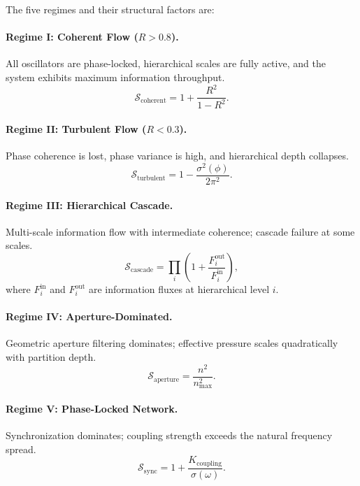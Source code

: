 \documentclass[twocolumn,10pt]{article}
\newcommand{\Rorder}{R}
\begin{document}
The five regimes and their structural factors are:

\paragraph{Regime I: Coherent Flow ($\Rorder > 0.8$).}
All oscillators are phase-locked, hierarchical scales are fully active, and the system exhibits maximum information throughput.
\begin{equation}
  \mathcal{S}_{\mathrm{coherent}} = 1 + \frac{\Rorder^{2}}{1 - \Rorder^{2}}.
  \label{eq:s_coherent}
\end{equation}

\paragraph{Regime II: Turbulent Flow ($\Rorder < 0.3$).}
Phase coherence is lost, phase variance is high, and hierarchical depth collapses.
\begin{equation}
  \mathcal{S}_{\mathrm{turbulent}} = 1 - \frac{\sigma^{2}(\phi)}{2\pi^{2}}.
  \label{eq:s_turbulent}
\end{equation}

\paragraph{Regime III: Hierarchical Cascade.}
Multi-scale information flow with intermediate coherence; cascade failure at some scales.
\begin{equation}
  \mathcal{S}_{\mathrm{cascade}} = \prod_{i} \left(1 + \frac{F_{i}^{\mathrm{out}}}{F_{i}^{\mathrm{in}}}\right),
  \label{eq:s_cascade}
\end{equation}
where $F_{i}^{\mathrm{in}}$ and $F_{i}^{\mathrm{out}}$ are information fluxes at hierarchical level $i$.

\paragraph{Regime IV: Aperture-Dominated.}
Geometric aperture filtering dominates; effective pressure scales quadratically with partition depth.
\begin{equation}
  \mathcal{S}_{\mathrm{aperture}} = \frac{n^{2}}{n_{\max}^{2}}.
  \label{eq:s_aperture}
\end{equation}

\paragraph{Regime V: Phase-Locked Network.}
Synchronization dominates; coupling strength exceeds the natural frequency spread.
\begin{equation}
  \mathcal{S}_{\mathrm{sync}} = 1 + \frac{K_{\mathrm{coupling}}}{\sigma(\omega)}.
  \label{eq:s_sync}
\end{equation}
\end{document}
